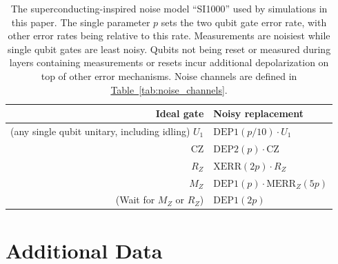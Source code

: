 \documentclass[onecolumn,unpublished,a4paper]{quantumarticle}
\theoremstyle{definition}
\theoremstyle{definition}
\theoremstyle{definition}
\newcommand{\tab}[1]{\hyperref[tab:#1]{Table~\ref*{tab:#1}}}
\begin{document}
\begin{table}[h]
    \centering
    \begin{tabular}{|r|l|}
    \hline
    Ideal gate & Noisy replacement
    \\
    \hline
    (any single qubit unitary, including idling) $U_1$ & $\text{DEP1}(p / 10) \cdot U_1$
    \\
    $\text{CZ}$ & $\text{DEP2}(p) \cdot \text{CZ}$
    \\
    \hline
    $R_Z$ & $\text{XERR}(2p) \cdot R_Z$
    \\
    $M_Z$ & $\text{DEP1}(p) \cdot \text{MERR}_Z(5p)$
    \\
    \hline
    (Wait for $M_Z$ or $R_Z$) & $\text{DEP1}(2p)$
    \\
    \hline
    \end{tabular}
    \caption{
        The superconducting-inspired noise model ``SI1000'' used by simulations in this paper.
        The single parameter $p$ sets the two qubit gate error rate, with other error rates being relative to this rate.
        Measurements are noisiest while single qubit gates are least noisy.
        Qubits not being reset or measured during layers containing measurements or resets incur additional depolarization on top of other error mechanisms.
        Noise channels are defined in \tab{noise_channels}.
    }
    \label{tab:noise_model}
\end{table}

\clearpage
\section{Additional Data}
\label{app:additional_data}
\end{document}
